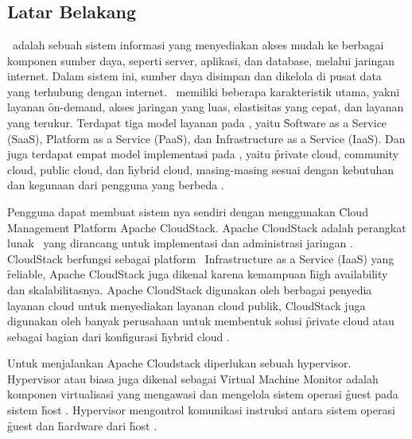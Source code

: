 \chapter{\babSatu}


\section{Latar Belakang}
\cc\ adalah sebuah sistem informasi yang menyediakan akses mudah ke berbagai komponen sumber daya, seperti server, aplikasi, dan database, melalui jaringan internet. Dalam sistem ini, sumber daya disimpan dan dikelola di pusat data yang terhubung dengan internet. \cc\ memiliki beberapa karakteristik utama, yakni layanan \f{on-demand}, akses jaringan yang luas, elastisitas yang cepat, dan layanan yang terukur. Terdapat tiga model layanan pada \cc, yaitu \f{Software as a Service} (SaaS), \f{Platform as a Service} (PaaS), dan Infrastructure as a Service (IaaS). Dan juga terdapat empat model implementasi pada \cc, yaitu \f{private cloud, community cloud, public cloud,} dan \f{hybrid cloud,} masing-masing sesuai dengan kebutuhan dan kegunaan dari pengguna yang berbeda \cite{mell2009nist}.

Pengguna dapat membuat sistem \cc nya sendiri dengan menggunakan \f{Cloud Management Platform} Apache CloudStack. Apache CloudStack adalah perangkat lunak \oss\ yang dirancang untuk implementasi dan administrasi jaringan \vm. CloudStack berfungsi sebagai platform \cc\ Infrastructure as a Service (IaaS) yang \f{reliable}, Apache CloudStack juga dikenal karena kemampuan \f{high availability} dan skalabilitasnya. Apache CloudStack digunakan oleh berbagai penyedia layanan cloud untuk menyediakan layanan cloud publik, CloudStack juga digunakan oleh banyak perusahaan untuk membentuk solusi \f{private cloud} atau sebagai bagian dari konfigurasi \f{hybrid cloud} \cite{cloudstackabout}.

Untuk menjalankan Apache Cloudstack diperlukan sebuah hypervisor. Hypervisor atau biasa juga dikenal sebagai \f{Virtual Machine Monitor} adalah komponen virtualisasi yang mengawasi dan mengelola sistem operasi \f{guest} pada sistem \f{host} \cite{scarfone2009nist}. Hypervisor mengontrol komunikasi instruksi antara sistem operasi \f{guest} dan \f{hardware} dari \f{host} \cite{scarfone2009nist}.

